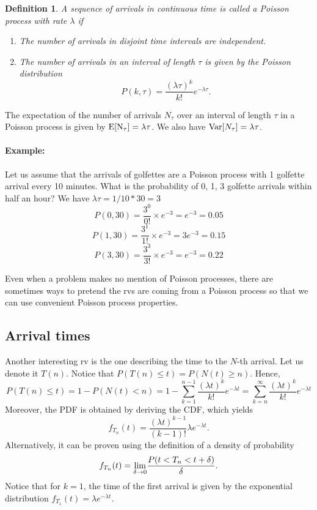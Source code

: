 \documentclass[12pt,a4paper]{article}
\newtheorem{definition}{Definition}
\begin{document}
\begin{definition}
	A sequence of arrivals in continuous time is called a Poisson process with rate $\lambda$ if
	\begin{enumerate}
		\item The number of arrivals in disjoint time intervals are independent.
		\item The number of arrivals in an interval of length $\tau$ is given by the Poisson distribution 
		$$
		P(k,\tau) = \frac{(\lambda\tau)^k}{k!}e^{-\lambda\tau}.
		$$
	\end{enumerate}
\end{definition}
The expectation of the number of arrivals $N_\tau$ over an interval of length $\tau$ in a Poisson process is given by $\rm E[N_\tau] = \lambda\tau$.
We also have ${\rm Var}[N_\tau] = \lambda\tau$.

\paragraph{Example: }
Let us assume that the arrivals of golfettes are a Poisson process with 1 golfette arrival every 10 minutes. 
What is the probability of 0, 1, 3 golfette arrivals within half an hour? We have $\lambda \tau = 1/10*30 = 3$
$$
P(0,30) = \frac{3^0}{0!}\times e^{-3} = e^{-3} = 0.05
$$
$$
P(1,30) = \frac{3^1}{1!}\times e^{-3} = 3e^{-3} = 0.15
$$
$$
P(3,30) = \frac{3^3}{3!}\times e^{-3} = e^{-3} = 0.22
$$

Even when a problem makes no mention of Poisson processes, there are sometimes ways to pretend the rvs are coming from a Poisson
process so that we can use convenient Poisson process properties.

\subsection{Arrival times}
Another interesting rv is the one describing the time to the $N$-th arrival. 
Let us denote it $T(n)$.
Notice that $P(T(n)\leq t) = P(N(t)\geq n)$.
Hence, 
\begin{equation}
	P(T(n)\leq t) = 1 - P(N(t)< n) = 1-\sum_{k = 1}^{n-1} \frac{(\lambda t)^k}{k!}e^{-\lambda t}
	= \sum_{k = n}^\infty \frac{(\lambda t)^k}{k!}e^{-\lambda t}
\end{equation}
Moreover, the PDF is obtained by deriving the CDF, which yields
\begin{equation}
	f_{T_n}(t) = \frac{(\lambda t)^{k-1}}{(k-1)!}\lambda e^{-\lambda t}.
\end{equation}
Alternatively, it can be proven using the definition of a density of probability
\begin{equation}
f_{T_n}(t) = \underset{\delta\rightarrow 0}{\rm lim} \frac{P(t<T_n<t+\delta)}{\delta}.
\end{equation}
Notice that for $k=1$, the time of the first arrival is given by the exponential distribution  $f_{T_1}(t) = \lambda e^{-\lambda t}$.
\end{document}
